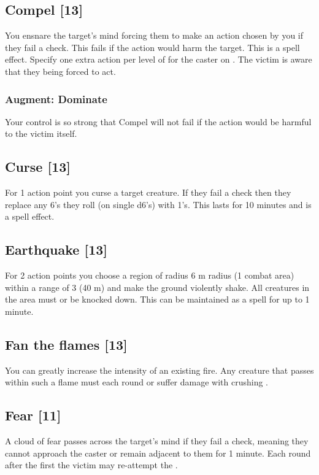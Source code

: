 \subsection{Compel [13]}
You ensnare the target's mind forcing them to make an action chosen by you if they fail a  check. This fails if the action would harm the target. This is a  spell effect. Specify one extra action per level of  for the caster on . The victim is aware that they being forced to act.
\subsubsection{Augment: Dominate}
Your control is so strong that Compel will not fail if the action would be harmful to the victim itself.


\subsection{Curse [13]}
For 1 action point you curse a target creature. If they fail a  check then they replace any 6's they roll (on single d6's) with 1's. This lasts for 10 minutes and  is a  spell effect.


\subsection{Earthquake [13]}
For 2 action points you choose a region of radius 6 m radius (1 combat area) within a range of 3 (40 m) and make the ground violently shake. All creatures in the area must  or be knocked down. This can be maintained as a  spell for up to 1 minute.


\subsection{Fan the flames [13]}
You can greatly increase the intensity of an existing fire. Any creature that passes within such a flame must  each round or suffer damage with crushing . 


\subsection{Fear [11]}
A cloud of fear passes across the target's mind if they fail a  check, meaning they cannot approach the caster or remain adjacent to them for 1 minute. Each round after the first the victim may re-attempt the . 
